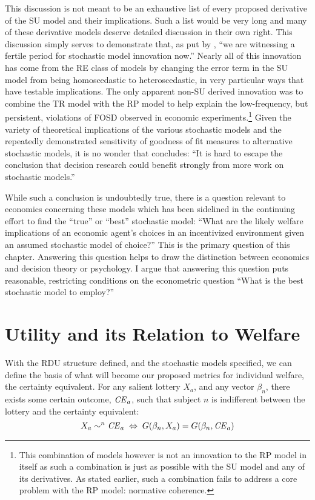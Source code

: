 \documentclass[../main.tex]{subfiles}
\begin{document}
This discussion is not meant to be an exhaustive list of every proposed derivative of the SU model and their implications.
Such a list would be very long and many of these derivative models deserve detailed discussion in their own right.
This discussion simply serves to demonstrate that, as put by \textcite[277]{Wilcox2008}, \enquote{we are witnessing a fertile period for stochastic model innovation now.}
Nearly all of this innovation has come from the RE class of models by changing the error term in the SU model from being homoscedastic to heteroscedastic, in very particular ways that have testable implications.
The only apparent non-SU derived innovation was to combine the TR model with the RP model to help explain the low-frequency, but persistent, violations of FOSD observed in economic experiments.\footnote{ This combination of models however is not an innovation to the RP model in itself as such a combination is just as possible with the SU model and any of its derivatives.
As stated earlier, such a combination fails to address a core problem with the RP model: normative coherence.} Given the variety of theoretical implications of the various stochastic models and the repeatedly demonstrated sensitivity of goodness of fit measures to alternative stochastic models, it is no wonder that \textcite[275]{Wilcox2008} concludes: \enquote{It is hard to escape the conclusion that decision research could benefit strongly from more work on stochastic models.}

While such a conclusion is undoubtedly true, there is a question relevant to economics concerning these models which has been sidelined in the continuing effort to find the \enquote{true} or \enquote{best} stochastic model: \enquote{What are the likely welfare implications of an economic agent's choices in an incentivized environment given an assumed stochastic model of choice?} This is the primary question of this chapter.
Answering this question helps to draw the distinction between economics and decision theory or psychology.
I argue that answering this question puts reasonable, restricting conditions on the econometric question \enquote{What is the best stochastic model to employ?}

\singlespacing
\section{Utility and its Relation to Welfare}
\doublespacing

With the RDU structure defined, and the stochastic models specified, we can define the basis of what will become our proposed metrics for individual welfare, the certainty equivalent.
For any salient lottery $X_a$, and any vector $\beta_n$, there exists some certain outcome, $\mathit{CE}_a$, such that subject $n$ is indifferent between the lottery and the certainty equivalent:
\begin{equation}
	\label{eq2:CE.indiff}
	X_a \sim^n {\mathit{CE}}_a \;\Leftrightarrow\; G(\beta_n,X_a) = G(\beta_n, {\mathit{CE}}_a)
\end{equation}
\end{document}
